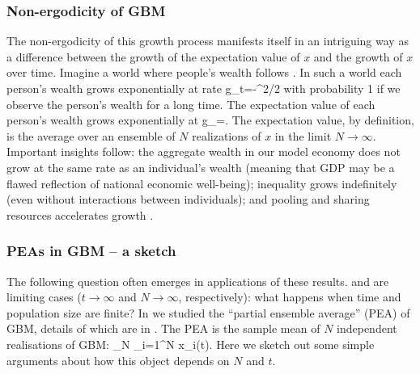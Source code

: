 \subsubsection{Non-ergodicity of GBM}
The non-ergodicity of this growth process
manifests itself in an intriguing way as a difference between the growth of the expectation
value of $x$ and the growth of $x$ over time. Imagine a world where people's wealth 
follows . In such a world each person's wealth grows exponentially at rate
\be
g_t=\mu-\sigma^2/2
\ee
with probability 1 if we observe the person's wealth for a long time.
The expectation value of each person's wealth grows exponentially at
\be
g_{\ave{}}=\mu.
\ee
The expectation value, by definition, is the average over an ensemble of $N$ realizations of
$x$ in the limit $N\to\infty$. Important insights follow: the aggregate wealth in our model 
economy does not grow at the same rate as an individual's wealth \cite{AdamouPeters2016} (meaning that GDP may be a flawed reflection of national
economic well-being); inequality grows indefinitely \cite{BouchaudMezard2000,BermanPetersAdamou2017} (even without interactions between individuals); and 
pooling and sharing resources accelerates growth \cite{PetersAdamou2015a,Bouchaud2015}.

\subsubsection{PEAs in GBM -- a sketch}
The following question often emerges in applications of these results.  and  are limiting cases ($t \to \infty$ and $N\to\infty$, respectively): what happens when time and population size are finite? In \cite{PetersKlein2013} we studied the ``partial ensemble average'' (PEA) of GBM, details of which are in . The PEA is the sample mean of $N$ independent realisations of GBM:
\be
{}_N \equiv {} \sum_{i=1}^N x_i(t).
\ee
Here we sketch out some simple arguments about how this object depends on $N$ and $t$.

